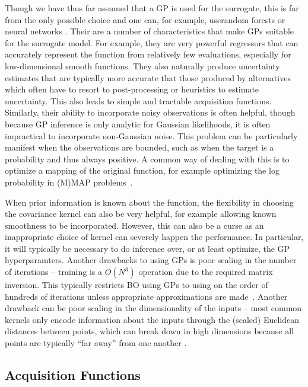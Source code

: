 Though we have thus far assumed that a GP is used for the surrogate, this is far from the only possible choice
and one can, for example, userandom forests \citep{bergstra2011algorithms,hutter2011sequential} 
or neural networks \citep{snoek2015scalable}.  Their are a number
of characteristics that make GPs suitable for the surrogate model.  For example, they are very powerful
regressors that can accurately represent the function from relatively few evaluations, especially
for low-dimensional smooth functions.  They also naturally produce uncertainty estimates
that are typically more accurate that those produced by alternatives which often
have to resort to post-processing or heuristics to estimate uncertainty.
This also leads to simple and tractable acquisition functions.  Similarly, their ability to incorporate
noisy observations is often helpful, though because GP inference is only analytic for Gaussian
likelihoods, it is often impractical to incorporate non-Gaussian noise.  This problem can be
particularly manifest when the observations are bounded, such as when the target is a probability
and thus always positive.  A common way of dealing with this is to optimize a mapping of the
original function, for example optimizing the log probability in (M)MAP problems~\citep{osborne2010bayesian}.

When prior information is known about the function, the
flexibility in choosing the covariance kernel can also be very helpful, for example allowing known
smoothness to be incorporated.  However, this can also be a curse as an inappropriate choice of
kernel can severely happen the performance.  In particular, it will typically be necessary to
do inference over, or at least optimize, the GP hyperparamters.  Another drawbacks to using GPs
is poor scaling in the number of iterations -- training is a $O(N^3)$ operation due to the required
matrix inversion.  This typically restricts BO using GPs to using on the order of hundreds of iterations
unless appropriate approximations are made~\citep{snelson2006sparse,hensman2013gaussian}.
Another drawback can be poor scaling in the dimensionality of the inputs -- most common kernels
only encode information about the inputs through the (scaled) Euclidean distances between points,
which can break down in high dimensions because all points are typically
``far away'' from one another \citep{bengio2006curse}.  

\subsection{Acquisition Functions}
\label{sec:opt:BO:acq}

